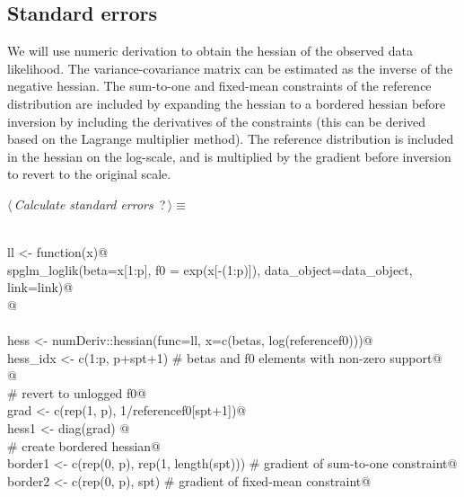 \documentclass[reqno]{amsart}
\renewcommand{\NWtarget}[2]{\hypertarget{#1}{#2}}
\begin{document}
\subsection{Standard errors}

We will use numeric derivation to obtain the hessian of the observed data likelihood. The variance-covariance matrix can be estimated as the inverse of the negative hessian. The sum-to-one and fixed-mean constraints of the reference distribution are included by expanding the hessian to a bordered hessian before inversion by including the derivatives of the constraints (this can be derived based on the Lagrange multiplier method). The reference distribution is included in the hessian on the log-scale, and is multiplied by the gradient before inversion to revert to the original scale.

\begin{flushleft} \small\label{scrap13}\raggedright\small
\NWtarget{nuweb?}{} $\langle\,${\itshape Calculate standard errors}\nobreak\ {\footnotesize {?}}$\,\rangle\equiv$
\vspace{-1ex}
\begin{list}{}{} \item
\mbox{}\verb@@\\
\mbox{}\verb@  ll <- function(x){@\\
\mbox{}\verb@    spglm_loglik(beta=x[1:p], f0 = exp(x[-(1:p)]), data_object=data_object, link=link)@\\
\mbox{}\verb@  }@\\
\mbox{}\verb@@\\
\mbox{}\verb@  hess <- numDeriv::hessian(func=ll,  x=c(betas, log(referencef0)))@\\
\mbox{}\verb@  hess_idx <- c(1:p, p+spt+1) # betas and f0 elements with non-zero support@\\
\mbox{}\verb@  @\\
\mbox{}\verb@  # revert to unlogged f0@\\
\mbox{}\verb@  grad <- c(rep(1, p), 1/referencef0[spt+1])@\\
\mbox{}\verb@  hess1 <- diag(grad) %*% hess[hess_idx, hess_idx] %*% diag(grad)@\\
\mbox{}\verb@  @\\
\mbox{}\verb@  # create bordered hessian@\\
\mbox{}\verb@  border1 <- c(rep(0, p), rep(1, length(spt)))  # gradient of sum-to-one constraint@\\
\mbox{}\verb@  border2 <- c(rep(0, p), spt)          # gradient of fixed-mean constraint@\\

\end{list}
\end{flushleft}
\end{document}
